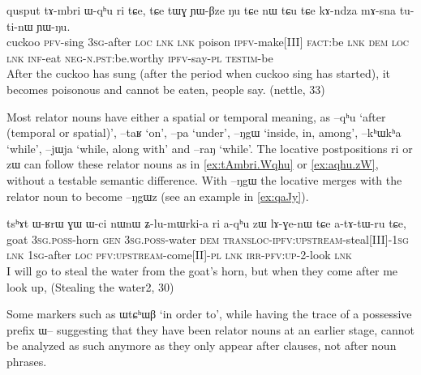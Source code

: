 \documentclass[oldfontcommands,oneside,a4paper,11pt]{article}
\newcommand{\ipa}[1]{{\phon \mbox{#1}}} %
\begin{document}
 \begin{exe}
\ex \label{ex:tAmbri.Wqhu} 
\gll 
\ipa{qusput}  	\ipa{tɤ-mbri}  	\ipa{ɯ-qʰu}  	\ipa{ri}  	\ipa{tɕe,}  	\ipa{tɕe}  	\ipa{tɯɣ}  	\ipa{ɲɯ-βze}  	\ipa{ŋu}  	\ipa{tɕe}  	\ipa{nɯ} \ipa{tɕu}  	\ipa{tɕe}  	\ipa{kɤ-ndza}  	\ipa{mɤ-sna}  	\ipa{tu-ti-nɯ}  	\ipa{ɲɯ-ŋu.}  \\
cuckoo \textsc{pfv}-sing \textsc{3sg}-after \textsc{loc} \textsc{lnk} \textsc{lnk} poison \textsc{ipfv}-make[III] \textsc{fact}:be \textsc{lnk}  \textsc{dem} \textsc{loc} \textsc{lnk} \textsc{inf}-eat \textsc{neg-n.pst}:be.worthy \textsc{ipfv}-say-\textsc{pl} \textsc{testim}-be \\
\glt After the cuckoo has sung (after the period when cuckoo sing has started), it becomes poisonous and cannot be eaten, people say. (nettle, 33)
\end{exe}

Most relator nouns have either a spatial or temporal meaning, as \ipa{--qʰu} `after (temporal or spatial)',  \ipa{--taʁ} `on',  \ipa{--pa} `under',  \ipa{--ŋgɯ} `inside, in, among', \ipa{--kʰɯkʰa} `while', \ipa{--jɯja} `while, along with' and \ipa{--raŋ} `while'. The locative postpositions \ipa{ri} or \ipa{zɯ} can follow these relator nouns as in \ref{ex:tAmbri.Wqhu}  or \ref{ex:aqhu.zW}, without a testable semantic difference. With \ipa{--ŋgɯ} the  locative merges with the relator noun to  become \ipa{--ŋgɯz} (see an example in \ref{ex:qaJy}).

 \begin{exe}
\ex \label{ex:aqhu.zW} 
\gll
\ipa{tsʰɤt}  	\ipa{ɯ-ʁrɯ}  	\ipa{ɣɯ}  	\ipa{ɯ-ci}  	\ipa{nɯnɯ}  	\ipa{ʑ-lu-mɯrki-a}  	\ipa{ri}  	\ipa{a-qʰu}  	\ipa{zɯ}  	\ipa{lɤ-ɣe-nɯ}  	\ipa{tɕe}  \ipa{a-tɤ-tɯ-ru}  	\ipa{tɕe,}  \\
goat \textsc{3sg.poss}-horn \textsc{gen} \textsc{3sg.poss}-water \textsc{dem}  \textsc{transloc-ipfv:upstream}-steal[III]-\textsc{1sg} \textsc{lnk} \textsc{1sg}-after \textsc{loc} \textsc{pfv:upstream}-come[II]-\textsc{pl} \textsc{lnk} \textsc{irr-pfv:up}-2-look \textsc{lnk} \\
\glt I will go to steal the water from the goat's horn, but when they come after me look up, (Stealing the water2, 30)
\end{exe}

Some markers such as  \ipa{ɯtɕʰɯβ} `in order to', while having the trace of a possessive prefix \ipa{ɯ--} suggesting that they have been relator nouns at an earlier stage, cannot be analyzed as such anymore as they only appear after clauses, not after noun phrases.
\end{document}
